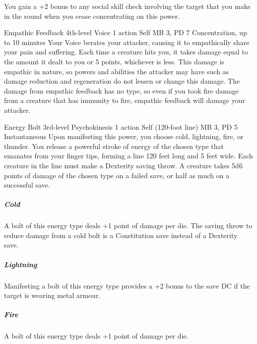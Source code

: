 You gain a +2 bonus to any social skill check involving the target
that you make in the round when you cease concentrating on this power.

\DndPowerHeader%
  {Empathic Feedback}
  {4th-level Voice}
  {1 action}
  {Self}
  {MB 3, PD 7}
  {Concentration, up to 10 minutes}
Your Voice berates your attacker,
causing it to empathically share your pain and suffering.
Each time a creature hits you,
it takes damage equal to the amount it dealt to you or 5 points,
whichever is less.
This damage is empathic in nature,
so powers and abilities the attacker may have such as damage reduction
and regeneration do not lessen or change this damage.
The damage from empathic feedback has no type,
so even if you took fire damage from a creature
that has immunity to fire,
empathic feedback will damage your attacker.

\DndPowerHeader%
  {Energy Bolt}
  {3rd-level Psychokinesis}
  {1 action}
  {Self (120-foot line)}
  {MB 3, PD 5}
  {Instantaneous}
  Upon manifesting this power, you choose cold, lightning,
  fire, or thunder.
  You release a powerful stroke of energy of the chosen type
  that emanates from your finger tips,
  forming a line 120 feet long and 5 feet wide.
  Each creature in the line must make a Dexterity saving throw.
  A creature takes 5d6 points of damage of the chosen type
  on a failed save,
  or half as much on a successful save.
  
  \subparagraph{Cold}
  A bolt of this energy type deals +1 point of damage per die.
  The saving throw to reduce damage from a cold bolt
  is a Constitution save instead of a Dexterity save.
  
  \subparagraph{Lightning}
  Manifesting a bolt of this energy type provides
  a +2 bonus to the save DC if the target is wearing metal armour.
  
  \subparagraph{Fire}
  A bolt of this energy type deals +1 point of damage per die.
  
